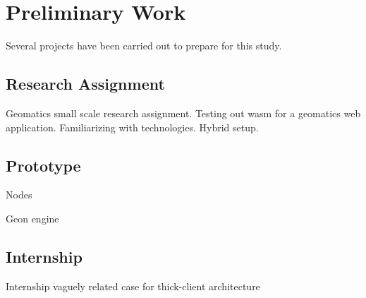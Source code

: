

\section{Preliminary Work}

Several projects have been carried out to prepare for this study. 

\subsection*{Research Assignment}

Geomatics small scale research assignment.
Testing out wasm for a geomatics web application.
Familiarizing with technologies.
Hybrid setup.

\subsection*{Prototype}

Nodes 

Geon engine


\subsection*{Internship}

Internship vaguely related
case for thick-client architecture
